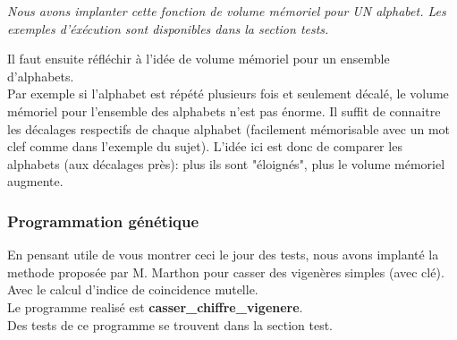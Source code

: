 \documentclass[a4paper, 11pt]{article}
\begin{document}
\textit{Nous avons implanter cette fonction de volume mémoriel pour UN
alphabet. Les exemples d'éxécution sont disponibles dans la section
tests.\\}

Il faut ensuite réfléchir à l'idée de volume mémoriel pour un ensemble
d'alphabets.\\
Par exemple si l'alphabet est répété plusieurs fois et seulement
décalé, le volume mémoriel pour l'ensemble des alphabets n'est pas
énorme. Il suffit de connaitre les décalages respectifs de chaque
alphabet (facilement mémorisable avec un mot clef comme dans l'exemple
du sujet). L'idée ici est donc de comparer les alphabets (aux
décalages près): plus ils sont "éloignés", plus le volume mémoriel
augmente.


\subsubsection{Programmation génétique}
En pensant utile de vous montrer ceci le jour des tests, nous avons
implanté la methode proposée par M. Marthon pour casser des vigenères
simples (avec clé). Avec le calcul d'indice de coincidence mutelle. \\

Le programme realisé est \textbf{casser\_chiffre\_vigenere}.\\
Des tests de ce programme se trouvent dans la section test.\\
\end{document}
